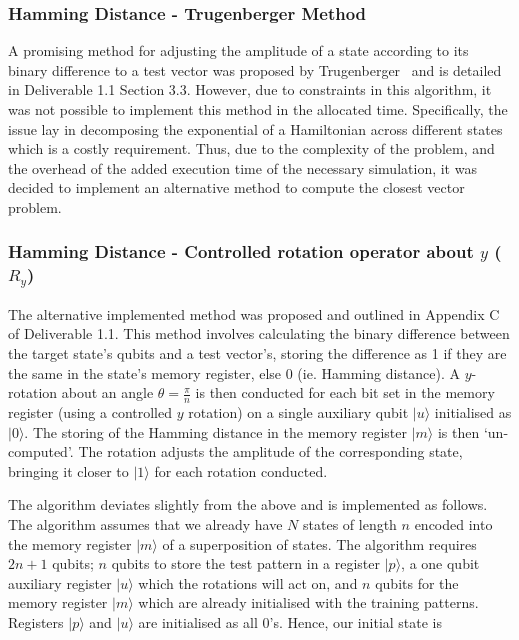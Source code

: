 \subsubsection{Hamming Distance - Trugenberger Method}
\label{sec:hamming_distance_trugenberger_method}
A promising method for adjusting the amplitude of a state according to its binary difference to a test vector was proposed by Trugenberger~\cite{Trugenberger_2001, Trugenberger_2002} and is detailed in Deliverable 1.1 Section 3.3. However, due to constraints in this algorithm, it was not possible to implement this method in the allocated time. Specifically, the issue lay in decomposing the exponential of a Hamiltonian across different states which is a costly requirement. Thus, due to the complexity of the problem, and the overhead of the added execution time of the necessary simulation, it was decided to implement an alternative method to compute the closest vector problem.

\subsubsection{Hamming Distance - Controlled rotation operator about $\hat{y}$ (\textrm{$R_y$}) }
\label{sec:hamming_distance_cry_rotation}

The alternative implemented method was proposed and outlined in Appendix C of Deliverable 1.1. This method involves calculating the binary difference between the target state's qubits and a test vector's, storing the difference as 1 if they are the same in the state's memory register, else 0 (ie. Hamming distance). A $y$-rotation about an angle $\theta = \frac{\pi}{n}$ is then conducted for each bit set in the memory register (using a controlled $y$ rotation) on a single auxiliary qubit $\vert u \rangle$ initialised as $\vert 0 \rangle$. The storing of the Hamming distance in the memory register $\vert m \rangle$ is then `un-computed'. The rotation adjusts the amplitude of the corresponding state, bringing it closer to $\vert 1 \rangle$ for each rotation conducted.

The algorithm deviates slightly from the above and is implemented as follows. The algorithm assumes that we already have $N$ states of length $n$ encoded into the memory register $\vert m \rangle$ of a superposition of states. The algorithm requires $2n+1$ qubits; $n$ qubits to store the test pattern in a register $\vert p \rangle$, a one qubit auxiliary register $\vert u \rangle$ which the rotations will act on, and $n$ qubits for the memory register $\vert m \rangle$ which are already initialised with the training patterns. Registers $\vert p \rangle$ and $\vert u \rangle$ are initialised as all $0$'s. Hence, our initial state is

